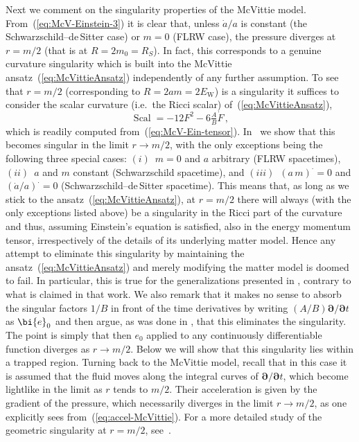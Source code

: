 \documentclass
[rmp,aps,twocolumn,showpacs,preprintnumbers,amsmath,amssymb]{revtex4}
\theoremstyle{plain}
\theoremstyle{definition}
\theoremstyle{remark}
\newcommand{\sss}{\scriptscriptstyle}
\newcommand{\ind}[1]{{\sss \text{#1}}}        %
\DeclareMathOperator{\Scal}{\mathrm{Scal}}    %
\newcommand{\bpartial}{\boldsymbol{\partial}} %
\newcommand{\bdot}{\boldsymbol{\cdot}}
\newcommand{\be}{\bi{e}}
\begin{document}
Next we comment on the singularity properties of the McVittie model. 
From~(\ref{eq:McV-Einstein-3}) it is clear that, unless $\dot{a}/a$ is 
constant (the Schwarzschild--de\,Sitter case) or $m=0$ (FLRW case), the 
pressure diverges at $r=m/2$ (that is at $R=2m_0=R_S$). In fact, this 
corresponds to a genuine curvature singularity which is built into 
the McVittie ansatz~(\ref{eq:McVittieAnsatz}) independently of
any further assumption. To see that $r=m/2$ (corresponding to 
$R=2am=2E_\ind{W}$) is a singularity it suffices to consider the 
scalar curvature (i.e.~the Ricci scalar) of~(\ref{eq:McVittieAnsatz}), 
%
\begin{equation}\label{eq:Scal-McV}
  \Scal = - 12F^2 - 6\tfrac{A}{B}\dot{F} \,, 
\end{equation}
%
which is readily computed from~(\ref{eq:McV-Ein-tensor}). 
In~\cite{Carrera.Giulini:2009a} we show that this becomes singular in the 
limit $r \to m/2$, with the only exceptions being the following three 
special cases: 
$(i)$~$m=0$ and $a$ arbitrary (FLRW spacetimes), 
$(ii)$~$a$ and $m$ constant (Schwarzschild spacetime), and 
$(iii)$~$(a\,m)^{\bdot}=0$ and $(\dot a/a)^{\bdot}=0$ 
(Schwarzschild--de\,Sitter spacetime). 
This means that, as long as we stick to the 
ansatz~(\ref{eq:McVittieAnsatz}), at $r=m/2$ there will always (with the 
only exceptions listed above) be a singularity in the Ricci part of the 
curvature and thus, assuming Einstein's equation is satisfied, also in 
the energy momentum tensor, irrespectively of the details of its underlying 
matter model. Hence any attempt to eliminate this singularity by 
maintaining the ansatz~(\ref{eq:McVittieAnsatz}) and merely modifying 
the matter model is doomed to fail. In particular, this is true for the 
generalizations presented in \cite{Faraoni.Jacques:2007}, contrary to 
what is claimed in that work. We also remark that it makes no sense to 
absorb the singular factors $1/B$ in front of the time derivatives by 
writing $(A/B)\bpartial/\bpartial t$ as $\be_0$ and then argue, as was 
done in \cite{Faraoni.Jacques:2007}, that this eliminates the singularity. 
The point is simply that then $e_0$ applied to any continuously 
differentiable function diverges as $r\rightarrow m/2$. 
Below we will show that this singularity lies within a trapped region. 
Turning back to the McVittie model, recall that in this case it is assumed 
that the fluid moves along the integral curves of $\bpartial/\bpartial t$, 
which become lightlike in the limit as $r$ tends to $m/2$. Their acceleration 
is given by the gradient of the pressure, which necessarily diverges in the 
limit $r\rightarrow m/2$, as one explicitly sees 
from~(\ref{eq:accel-McVittie}). For a more detailed study of the geometric 
singularity at $r=m/2$, see~\cite{Nolan:1999a,Nolan:1999b}. 
\end{document}
